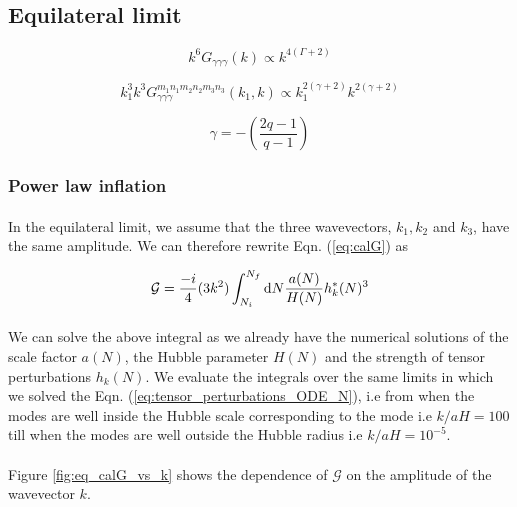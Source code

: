 \documentclass[12pt,a4paper,oneside]{book}
\begin{document}
\subsection{Equilateral limit}

\begin{equation}
k^6G_{\gamma\gamma\gamma}(k) \propto k^{4(\Gamma+2)}
\end{equation}

\begin{equation}
k_1^3k^3G_{\gamma\gamma\gamma}^{m_1n_1m_2n_2m_3n_3}(k_1,k) \propto k_1^{2(\gamma+2)}k^{2(\gamma+2)}
\end{equation}

\begin{equation}
\gamma = -\left(\frac{2q-1}{q-1}\right)
\end{equation}

\subsubsection{Power law inflation}

\paragraph*{} In the equilateral limit, we assume that the three wavevectors, $k_1, k_2$ and $k_3$, 
have the same amplitude. We can therefore rewrite Eqn. (\ref{eq:calG}) as 

\begin{equation}\label{eqn:calG_N_eq}
\mathcal{G} = \frac{-i}{4}(3k^2)\int^{N_f}_{N_i} {\rm d}N \frac{a(N)}{H(N)} h_{k}^{*}(N)^3
\end{equation}

\paragraph*{} We can solve the above integral as we already have the numerical solutions of the scale 
factor $a(N)$, the Hubble parameter $H(N)$ and the strength of tensor perturbations $h_k(N)$. We 
evaluate the integrals over the same limits in which we solved the Eqn. (\ref{eq:tensor_perturbations_ODE_N}), 
i.e from when the modes are well inside the Hubble scale corresponding to the mode i.e $k/aH = 100$ till 
when the modes are well outside the Hubble radius i.e $k/aH = 10^{-5}$.

\paragraph*{} Figure \ref{fig:eq_calG_vs_k} shows the dependence of $\mathcal{G}$ on the amplitude of the 
wavevector $k$.
\end{document}
